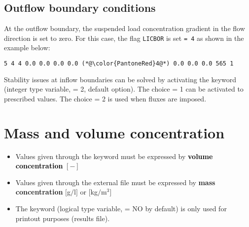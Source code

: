 \subsection{Outflow boundary conditions}
At the outflow boundary, the suspended load concentration gradient in the flow direction is set to zero. For this case, the flag \texttt{LICBOR} is set \texttt{= 4} as shown in the example below:

\begin{lstlisting}[frame=trBL]
5 4 4 0.0 0.0 0.0 0.0 (*@\color{PantoneRed}4@*) 0.0 0.0 0.0 565 1
\end{lstlisting}

Stability issues at inflow boundaries can be solved by activating the keyword  (integer type variable, {\ttfamily = 2}, default option). The choice {\ttfamily = 1} can be activated to prescribed values. The choice {\ttfamily = 2} is used when fluxes are imposed.

\section{Mass and volume concentration}
\begin{itemize}
\item Values given through the keyword  must be expressed by \textcolor{black}{\textbf{volume concentration}} $[-]$
\item Values given through the external file must be expressed by {\textbf{mass concentration}} $[$g$/$l$]$ or $[$kg$/$m$^3]$
\item The keyword  (logical type variable, {\ttfamily = NO} by default) is only used for printout purposes (results file).
\end{itemize}

